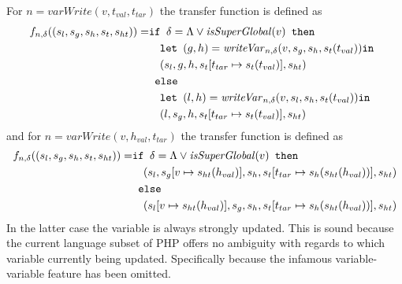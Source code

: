 For $n = \mathit{varWrite}(v,t_{val},t_{tar})$ the transfer function is defined as
\begin{align}
f_{n, \delta} ((s_l,s_g,s_h,s_t, s_{ht})) = &\texttt{if }\delta = \Lambda \vee \mathit{isSuperGlobal}(v)\texttt{ then } \notag\\
                                            &\quad\texttt{let } (g,h) = \mathit{writeVar}_{n,\delta}(v, s_g, s_h, s_t(t_{val})) \texttt{in }\notag\\
                                            &\quad (s_l,g,h,s_t[t_{tar}\mapsto s_t(t_{val})], s_{ht})\notag\\
                                            & \texttt{ else } \notag\\
                                            &\quad\texttt{let } (l,h) = \mathit{writeVar}_{n,\delta}(v, s_l, s_h, s_t(t_{val})) \texttt{in }\notag\\
                                            &\quad (l,s_g,h,s_t[t_{tar}\mapsto s_t(t_{val})], s_{ht})
\end{align}
and for $n = \mathit{varWrite}(v,h_{val},t_{tar})$ the transfer function is defined as
\begin{align}
f_{n, \delta} ((s_l,s_g,s_h,s_t, s_{ht})) = &\texttt{if }\delta = \Lambda \vee \mathit{isSuperGlobal}(v)\texttt{ then } \notag\\
                                            &\quad (s_l,s_g[v\mapsto s_{ht}(h_{val})],s_h,s_t[t_{tar}\mapsto s_h(s_{ht}(h_{val}))], s_{ht})\notag\\
                                            & \texttt{ else } \notag\\
                                            &\quad (s_l[v\mapsto s_{ht}(h_{val})],s_g,s_h,s_t[t_{tar}\mapsto s_h(s_{ht}(h_{val}))], s_{ht})
\end{align}
In the latter case the variable is always strongly updated. This is sound because the current language subset of PHP offers no ambiguity with regards to which variable currently being updated. Specifically because the infamous variable-variable feature has been omitted.


